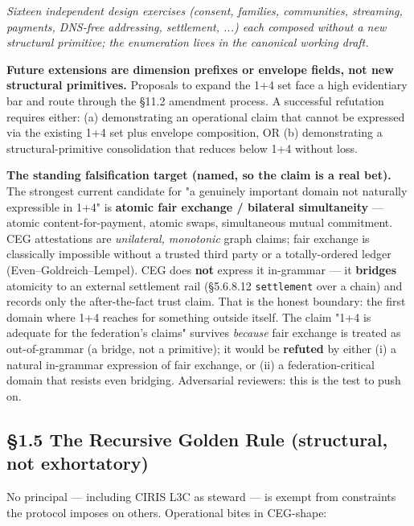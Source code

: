 \documentclass[11pt]{article}
\begin{document}
\textit{Sixteen independent design exercises (consent, families, communities, streaming, payments, DNS-free addressing, settlement, ...) each composed without a new structural primitive; the enumeration lives in the canonical working draft.}



\textbf{Future extensions are dimension prefixes or envelope fields, not new structural primitives.} Proposals to expand the 1+4 set face a high evidentiary bar and route through the §11.2 amendment process. A successful refutation requires either: (a) demonstrating an operational claim that cannot be expressed via the existing 1+4 set plus envelope composition, OR (b) demonstrating a structural-primitive consolidation that reduces below 1+4 without loss.


\textbf{The standing falsification target (named, so the claim is a real bet).} The strongest current candidate for "a genuinely important domain not naturally expressible in 1+4" is \textbf{atomic fair exchange / bilateral simultaneity} — atomic content-for-payment, atomic swaps, simultaneous mutual commitment. CEG attestations are \textit{unilateral, monotonic} graph claims; fair exchange is classically impossible without a trusted third party or a totally-ordered ledger (Even–Goldreich–Lempel). CEG does \textbf{not} express it in-grammar — it \textbf{bridges} atomicity to an external settlement rail (§5.6.8.12 \texttt{settlement} over a chain) and records only the after-the-fact trust claim. That is the honest boundary: the first domain where 1+4 reaches for something outside itself. The claim "1+4 is adequate for the federation's claims" survives \textit{because} fair exchange is treated as out-of-grammar (a bridge, not a primitive); it would be \textbf{refuted} by either (i) a natural in-grammar expression of fair exchange, or (ii) a federation-critical domain that resists even bridging. Adversarial reviewers: this is the test to push on.


\subsection*{§1.5 The Recursive Golden Rule (structural, not exhortatory)}


No principal — including CIRIS L3C as steward — is exempt from constraints the protocol imposes on others. Operational bites in CEG-shape:
\end{document}
